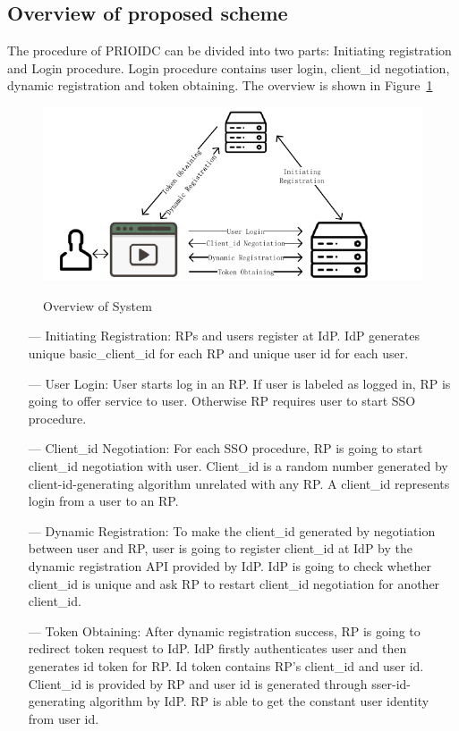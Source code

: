 \subsection{Overview of proposed scheme}
The procedure of PRIOIDC can be divided into two parts: Initiating registration and Login procedure. Login procedure contains user login, client\_id negotiation, dynamic registration and token obtaining. The overview is shown in Figure~\ref{fig:overview}
\begin{figure}
  \centering
  \includegraphics[width=\linewidth]{fig/prioidc.pdf}\label{fig:overview}
  \caption{Overview of System}
  \label{fig:overview}
\end{figure}
\begin{itemize}
\item[---] Initiating Registration: RPs and users register at IdP. IdP generates unique basic\_client\_id for each RP and unique user id for each user.
\item[---] User Login: User starts log in an RP. If user is labeled as logged in, RP is going to offer service to user. Otherwise RP requires user to start SSO procedure. 
\item[---] Client\_id Negotiation: For each SSO procedure, RP is going to start client\_id negotiation with user. Client\_id is a random number generated by client-id-generating algorithm unrelated with any RP. A client\_id represents login from a user to an RP.
\item[---] Dynamic Registration: To make the client\_id generated by negotiation between user and RP, user is going to register client\_id at IdP by the dynamic registration API provided by IdP. IdP is going to check whether client\_id is unique and ask RP to restart client\_id negotiation for another client\_id.
\item[---] Token Obtaining: After dynamic registration success, RP is going to redirect token request to IdP. IdP firstly authenticates user and then generates id token for RP. Id token contains RP's client\_id and user id. Client\_id is provided by RP and user id is generated through sser-id-generating algorithm by IdP. RP is able to get the constant user identity from user id.
\end{itemize}
 
